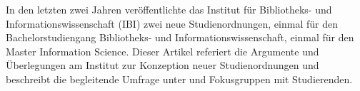 In den letzten zwei Jahren veröffentlichte das Institut für Bibliotheks-
und Informationswissenschaft (IBI) zwei neue Studienordnungen, einmal
für den Bachelorstudiengang Bibliotheks- und Informationswissenschaft,
einmal für den Master Information Science. Dieser Artikel referiert die
Argumente und Überlegungen am Institut zur Konzeption neuer
Studienordnungen und beschreibt die begleitende Umfrage unter und
Fokusgruppen mit Studierenden.
